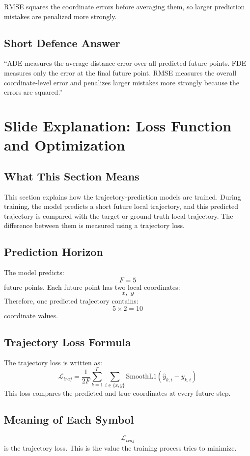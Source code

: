 \documentclass[11pt,a4paper]{article}
\begin{document}
RMSE squares the coordinate errors before averaging them, so larger prediction
mistakes are penalized more strongly.

\subsection*{Short Defence Answer}
``ADE measures the average distance error over all predicted future points. FDE
measures only the error at the final future point. RMSE measures the overall
coordinate-level error and penalizes larger mistakes more strongly because the
errors are squared.''

\newpage
\section*{Slide Explanation: Loss Function and Optimization}

\subsection*{What This Section Means}
This section explains how the trajectory-prediction models are trained. During
training, the model predicts a short future local trajectory, and this predicted
trajectory is compared with the target or ground-truth local trajectory. The
difference between them is measured using a trajectory loss.

\subsection*{Prediction Horizon}
The model predicts:
\[
    F = 5
\]
future points. Each future point has two local coordinates:
\[
    x,\; y
\]
Therefore, one predicted trajectory contains:
\[
    5 \times 2 = 10
\]
coordinate values.

\subsection*{Trajectory Loss Formula}
The trajectory loss is written as:
\[
    \mathcal{L}_{traj}
    =
    \frac{1}{2F}
    \sum_{k=1}^{F}
    \sum_{i\in\{x,y\}}
    \mathrm{SmoothL1}(\hat{y}_{k,i} - y_{k,i})
\]
This loss compares the predicted and true coordinates at every future step.

\subsection*{Meaning of Each Symbol}
\[
    \mathcal{L}_{traj}
\]
is the trajectory loss. This is the value the training process tries to
minimize.
\end{document}
